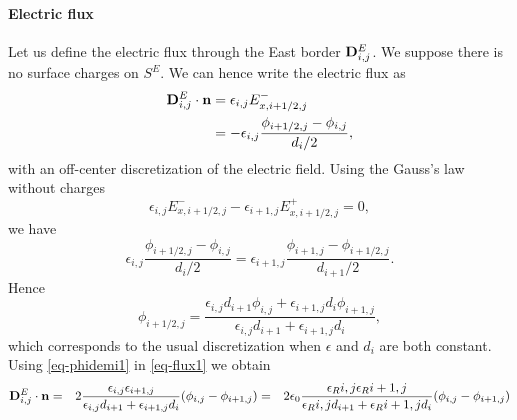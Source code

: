     \paragraph*{Electric flux \\}
    Let us define the electric flux through the East border  ${\mathbf D}^E_{i,j}$.
    We suppose there is no surface charges on $S^E$.
    We can hence write the electric flux as
    \begin{align} \label{eq-flux1}
      {\mathbf D}^E_{i,j} \cdot {\mathbf n} &= \epsilon_{i,j} E_{x, i+1/2,j}^-\\
                                      &= - \epsilon_{i,j} \frac{\phi_{i+1/2,j} - \phi_{i,j}}{d_i/2},
    \end{align}
    with an off-center discretization of the electric field.
    Using the Gauss's law without charges
    \begin{equation} \label{eq-gausslaw}
      \epsilon_{i,j}E_{x, i+1/2,j}^- - \epsilon_{i+1,j}E_{x, i+1/2,j}^+ =0,
    \end{equation}
    we have
    \begin{equation}
      \epsilon_{i,j} \frac{\phi_{i+1/2,j} - \phi_{i,j}}{d_i/2} = \epsilon_{i+1,j} \frac{\phi_{i+1,j} - \phi_{i+1/2,j}}{d_{i+1}/2}.
    \end{equation}
    Hence
    \begin{equation} \label{eq-phidemi1}
      \phi_{i+1/2,j} = \frac{\epsilon_{i,j} d_{i+1} \phi_{i,j} + \epsilon_{i+1,j} d_{i} \phi_{i+1,j} }{\epsilon_{i,j} d_{i+1} + \epsilon_{i+1,j} d_{i} },
    \end{equation}
    which corresponds to the usual discretization \citep{croes2017} when $\epsilon$ and $d_i$ are both constant.
    Using \cref{eq-phidemi1} in \cref{eq-flux1} we obtain
    \begin{align}
      \label{eq-nosc}
    {\mathbf D}^E_{i,j} \cdot {\mathbf n} &=& 2\frac{\epsilon_{i,j}\epsilon_{i+1,j}}{\epsilon_{i,j}d_{i+1} + \epsilon_{i+1,j} d_i} (\phi_{i,j}-\phi_{i+1,j})
    &=& 2\epsilon_0 \frac{\epsilon_{R}{i,j}\epsilon_{R}{i+1,j}}{\epsilon_{R}{i,j}d_{i+1} + \epsilon_{R}{i+1,j} d_i} (\phi_{i,j}-\phi_{i+1,j})
    \end{align}

